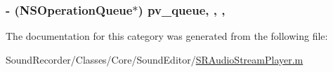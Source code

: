 \hypertarget{category_s_r_audio_stream_player_07_08_ad28b5a7e377666314211c6d8d66aa566}{
\subsubsection[{pv\-\_\-queue}]{\setlength{\rightskip}{0pt plus 5cm}-\/ (N\-S\-Operation\-Queue$\ast$) pv\-\_\-queue\hspace{0.3cm}{\ttfamily [read]}, {\ttfamily [write]}, {\ttfamily [nonatomic]}, {\ttfamily [strong]}}}\label{category_s_r_audio_stream_player_07_08_ad28b5a7e377666314211c6d8d66aa566}


The documentation for this category was generated from the following file\-:\begin{DoxyCompactItemize}
\item 
Sound\-Recorder/\-Classes/\-Core/\-Sound\-Editor/\hyperlink{_s_r_audio_stream_player_8m}{S\-R\-Audio\-Stream\-Player.\-m}\end{DoxyCompactItemize}
